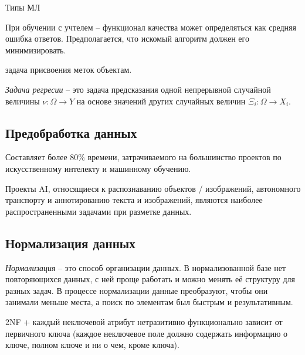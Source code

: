 
Типы МЛ

При обучении с учтелем -- функционал качества может определяться как средняя ошибка ответов. Предполагается, что искомый алгоритм должен его минимизировать.

\begin{definition}
  задача присвоения меток объектам.
\end{definition}

\begin{definition}
  \emph{Задача регресии} -- это задача предсказания одной непрерывной случайной величины $\nu : \Omega \rightarrow Y$ на основе значений других случайных величин $\Xi_i : \Omega \rightarrow X_i$.
\end{definition}

\subsection{Предобработка данных}

Составляет более 80\% времени, затрачиваемого на большинство проектов по искусственному интелекту и машинному обучению.

Проекты AI, относящиеся к распознаванию объектов / изображений, автономного транспорту и аннотированию текста и изображений, являются наиболее распространенными задачами при разметке данных.

\subsection{Нормализация данных}

\begin{definition}[Нормализация]
  \emph{Нормализация} -- это способ организации данных. В нормализованной базе нет повторяющихся данных, с ней проще работать и можно менять её структуру для разных задач. В процессе нормализации данные преобразуют, чтобы они занимали меньше места, а поиск по элементам был быстрым и результативным.
\end{definition}

\begin{definition}
  2NF + каждый неключевой атрибут нетразитивно функционально зависит от первичного ключа (каждое неключевое поле должно содержать информацию о ключе, полном ключе и ни о чем, кроме ключа).
\end{definition}

